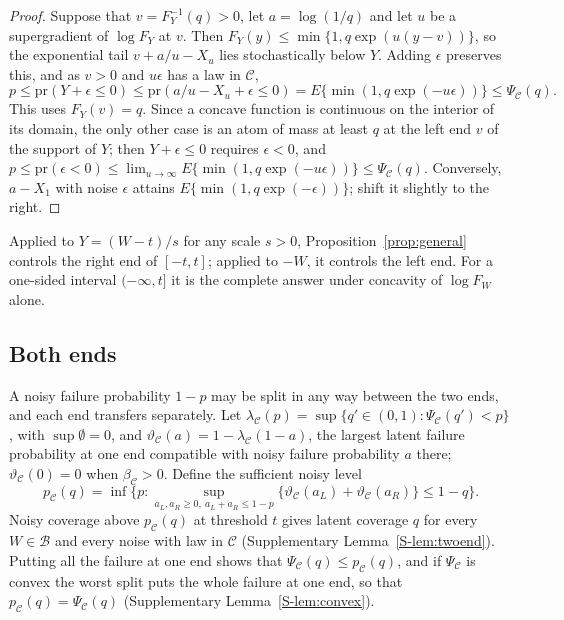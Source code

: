 \documentclass[12pt]{article}
\theoremstyle{definition}
\newcommand{\pr}{\mathrm{pr}}
\newcommand{\B}{\mathcal{B}}
\newcommand{\E}{\mathcal{C}}
\begin{document}
\begin{proof}
Suppose that $v = F_Y^{-1}(q) > 0$, let $a = \log(1/q)$ and let $u$ be a supergradient of $\log F_Y$ at $v$. Then $F_Y(y) \le \min\{1, q\exp(u(y - v))\}$, so the exponential tail $v + a/u - X_u$ lies stochastically below $Y$. Adding $\epsilon$ preserves this, and as $v > 0$ and $u\epsilon$ has a law in $\E$,
\[
p \le \pr(Y + \epsilon \le 0) \le \pr(a/u - X_u + \epsilon \le 0) = E\{\min(1, q \exp(-u\epsilon))\} \le \Psi_{\E}(q).
\]
This uses $F_Y(v) = q$. Since a concave function is continuous on the interior of its domain, the only other case is an atom of mass at least $q$ at the left end $v$ of the support of $Y$; then $Y + \epsilon \le 0$ requires $\epsilon < 0$, and $p \le \pr(\epsilon < 0) \le \lim_{u\to\infty} E\{\min(1, q \exp(-u\epsilon))\} \le \Psi_{\E}(q)$. Conversely, $a - X_1$ with noise $\epsilon$ attains $E\{\min(1, q \exp(-\epsilon))\}$; shift it slightly to the right.
\end{proof}

Applied to $Y = (W - t)/s$ for any scale $s > 0$, Proposition~\ref{prop:general} controls the right end of $[-t, t]$; applied to $-W$, it controls the left end. For a one-sided interval $(-\infty, t]$ it is the complete answer under concavity of $\log F_W$ alone.

\subsection{Both ends}

A noisy failure probability $1 - p$ may be split in any way between the two ends, and each end transfers separately. Let $\lambda_{\E}(p) = \sup\{q' \in (0, 1) : \Psi_{\E}(q') < p\}$, with $\sup\emptyset = 0$, and $\vartheta_{\E}(a) = 1 - \lambda_{\E}(1 - a)$, the largest latent failure probability at one end compatible with noisy failure probability $a$ there; $\vartheta_{\E}(0) = 0$ when $\beta_{\E} > 0$. Define the sufficient noisy level
\begin{equation}\label{eq:pE}
p_{\E}(q) = \inf\Big\{p : \sup_{a_L, a_R \ge 0,\ a_L + a_R \le 1 - p}\{\vartheta_{\E}(a_L) + \vartheta_{\E}(a_R)\} \le 1 - q\Big\}.
\end{equation}
Noisy coverage above $p_{\E}(q)$ at threshold $t$ gives latent coverage $q$ for every $W \in \B$ and every noise with law in $\E$ (Supplementary Lemma~\ref{S-lem:twoend}). Putting all the failure at one end shows that $\Psi_{\E}(q) \le p_{\E}(q)$, and if $\Psi_{\E}$ is convex the worst split puts the whole failure at one end, so that $p_{\E}(q) = \Psi_{\E}(q)$ (Supplementary Lemma~\ref{S-lem:convex}).
\end{document}
